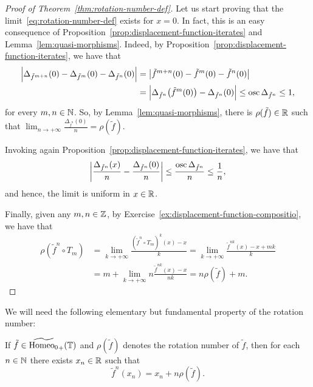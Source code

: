 \begin{proof}[Proof of Theorem~\ref{thm:rotation-number-def}]
  Let us start proving that the limit~\eqref{eq:rotation-number-def} exists for $x=0$. In fact, this is an easy consequence of Proposition~\ref{prop:displacement-function-iterates} and Lemma~\ref{lem:quasi-morphisms}. Indeed, by Proposition~\ref{prop:displacement-function-iterates}, we have that
  \begin{displaymath}
    \begin{split}
      \left\lvert{\Delta_{\tilde f^{m+n}}(0)-\Delta_{\tilde f^m}(0)-\Delta_{\tilde f^n}(0)}\right\rvert&= \left\lvert{\tilde f^{m+n}(0)-\tilde f^m(0)-\tilde f^n(0)}\right\rvert \\
      &= \left\lvert{\Delta_{\tilde f^n}\big(\tilde f^m(0)\big) - \Delta_{\tilde f^n}(0)}\right\rvert\leq\operatorname{osc}\Delta_{\tilde f^n} \leq 1, \\
      \end{split}
    \end{displaymath}
    for every $m,n\in\mathbb{N}$. So, by Lemma~\ref{lem:quasi-morphisms}, there is $\rho(\tilde f)\in\mathbb{R}$ such that $\lim_{n\to+\infty} \frac{\Delta_{\tilde f^n}(0)}{n}=\rho(\tilde f)$.

    Invoking again Proposition~\ref{prop:displacement-function-iterates}, we have that
    \begin{displaymath}
      \left\lvert{\frac{\Delta_{\tilde f^n}(x)}{n}-\frac{\Delta_{\tilde f^n}(0)}{n}}\right\rvert\leq\frac{\operatorname{osc}\Delta_{\tilde f^n}}{n}\leq\frac{1}{n},
    \end{displaymath}
    and hence, the limit is uniform in $x\in\mathbb{R}$.

    Finally, given any $m,n\in\mathbb{Z}$, by Exercise~\ref{ex:displacement-function-compositio}, we have that
    \begin{displaymath}
      \begin{split}
        \rho(\tilde f^n\circ T_m) &= \lim_{k\to+\infty} \frac{(\tilde f^n\circ T_m)^k(x) -x}{k} = \lim_{k\to+\infty}
                                    \frac{\tilde f^{nk}(x)-x + mk}{k} \\
                                  &= m+ \lim_{k\to+\infty} n\frac{\tilde f^{nk}(x)-x}{nk} = n\rho(\tilde f) + m.
      \end{split}
    \end{displaymath}
\end{proof}

We will need the following elementary but fundamental property of the rotation number:

\begin{proposition}
  \label{prop:existence-point-exact-displacement-rotation-number}
  If $\tilde f\in\widetilde{\mathrm{Homeo}_0}_+(\mathbb{T})$ and $\rho(\tilde f)$ denotes the rotation number of $\tilde f$, then for each $n\in\mathbb{N}$ there exists $x_n\in\mathbb{R}$ such that
  \begin{displaymath}
    \tilde f^n(x_n)=x_n+n\rho(\tilde f).
  \end{displaymath}
\end{proposition}

